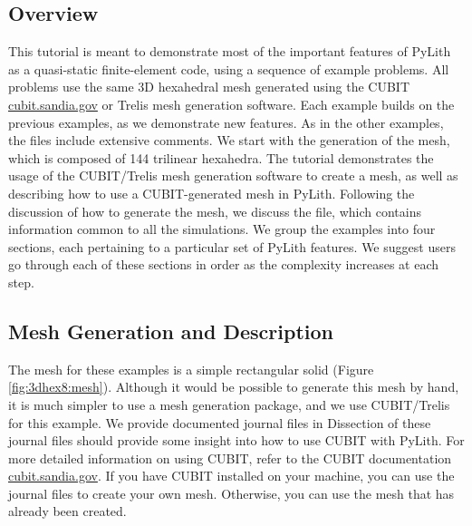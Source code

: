 \subsection{Overview}

This tutorial is meant to demonstrate most of the important features
of PyLith as a quasi-static finite-element code, using a sequence of
example problems. All problems use the same 3D hexahedral mesh
generated using the CUBIT \url{cubit.sandia.gov} or Trelis mesh generation
software. Each example builds on the previous examples, as we
demonstrate new features. As in the other examples, the files include
extensive comments. We start with the generation of the mesh, which is
composed of 144 trilinear hexahedra. The tutorial demonstrates the
usage of the CUBIT/Trelis mesh generation software to create a mesh, as well
as describing how to use a CUBIT-generated mesh in PyLith. Following
the discussion of how to generate the mesh, we discuss the
 file, which contains information common to
all the simulations. We group the examples into four sections, each
pertaining to a particular set of PyLith features. We suggest users go
through each of these sections in order as the complexity increases at
each step.


\subsection{Mesh Generation and Description}

The mesh for these examples is a simple rectangular solid (Figure
\vref{fig:3dhex8:mesh}). Although it would be possible to generate
this mesh by hand, it is much simpler to use a mesh generation
package, and we use CUBIT/Trelis for this example. We provide documented
journal files in  Dissection of these
journal files should provide some insight into how to use CUBIT with
PyLith. For more detailed information on using CUBIT, refer to the
CUBIT documentation \url{cubit.sandia.gov}. If you have CUBIT
installed on your machine, you can use the journal files to create
your own mesh. Otherwise, you can use the mesh that has already been
created.

